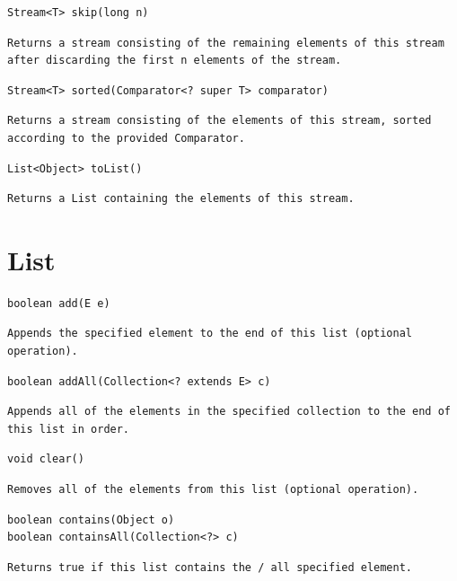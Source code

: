 \documentclass[5pt, portrait]{article}
\begin{document}
\begin{verbatim}
Stream<T> skip(long n)
\end{verbatim}
\begin{verbatim}
Returns a stream consisting of the remaining elements of this stream after discarding the first n elements of the stream.
\end{verbatim} 

\begin{verbatim}
Stream<T> sorted(Comparator<? super T> comparator)
\end{verbatim}
\begin{verbatim}
Returns a stream consisting of the elements of this stream, sorted according to the provided Comparator.
\end{verbatim} 

\begin{verbatim}
List<Object> toList()
\end{verbatim}
\begin{verbatim}
Returns a List containing the elements of this stream.
\end{verbatim} 

\section{List}
\begin{verbatim}
boolean add(E e)
\end{verbatim}
\begin{verbatim}
Appends the specified element to the end of this list (optional operation).
\end{verbatim}

\begin{verbatim}
boolean addAll(Collection<? extends E> c)
\end{verbatim}
\begin{verbatim}
Appends all of the elements in the specified collection to the end of this list in order.
\end{verbatim}

\begin{verbatim}
void clear()
\end{verbatim}
\begin{verbatim}
Removes all of the elements from this list (optional operation).
\end{verbatim}

\begin{verbatim}
boolean contains(Object o)
boolean containsAll(Collection<?> c)
\end{verbatim}
\begin{verbatim}
Returns true if this list contains the / all specified element.
\end{verbatim}
\end{document}
